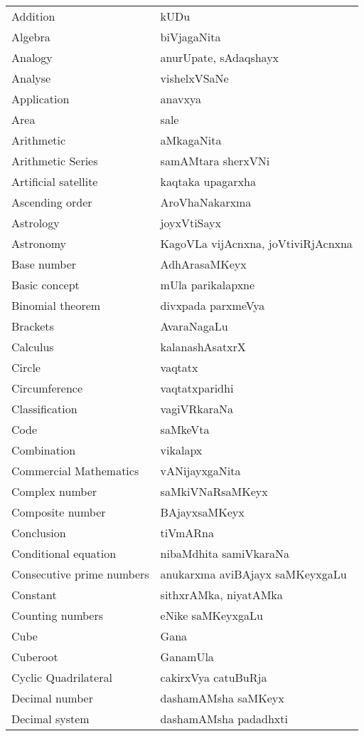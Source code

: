 {\begin{longtable}{>{\rm}l@{\hspace{1cm}}l}
Addition & kUDu\\
Algebra & biVjagaNita\\
Analogy & anurUpate, sAdaqshayx\\
Analyse & vishelxVSaNe\\
Application & anavxya\\
Area & sale\\
Arithmetic & aMkagaNita\\
Arithmetic Series & samAMtara sherxVNi\\
Artificial satellite & kaqtaka upagarxha\\
Ascending order & AroVhaNakarxma\\
Astrology & joyxVtiSayx\\
Astronomy & KagoVLa vijAcnxna, joVtiviRjAcnxna\\
Base number & AdhArasaMKeyx\\
Basic concept & mUla parikalapxne\\
Binomial theorem & divxpada parxmeVya\\
Brackets &  AvaraNagaLu\\
Calculus & kalanashAsatxrX\\
Circle & vaqtatx\\
Circumference & vaqtatxparidhi\\
Classification & vagiVRkaraNa\\
Code & saMkeVta\\
Combination & vikalapx\\
Commercial Mathematics & vANijayxgaNita\\
Complex number & saMkiVNaRsaMKeyx\\
Composite number & BAjayxsaMKeyx\\
Conclusion & tiVmARna\\
Conditional equation & nibaMdhita samiVkaraNa\\
Consecutive prime numbers & anukarxma aviBAjayx saMKeyxgaLu\\
Constant & sithxrAMka, niyatAMka\\
Counting numbers & eNike saMKeyxgaLu\\
Cube & Gana\\
Cuberoot & GanamUla\\
Cyclic Quadrilateral & cakirxVya catuBuRja\\
Decimal number & dashamAMsha saMKeyx\\
Decimal system & dashamAMsha padadhxti\\

\end{longtable}}
